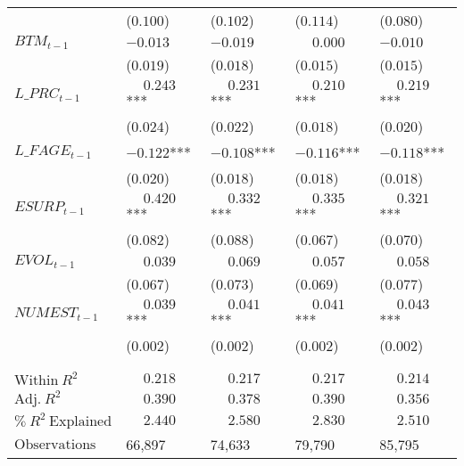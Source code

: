 \begin{table}
\begin{tabular}[t]{>{\raggedright\arraybackslash}p{3.1cm}>{\raggedright\arraybackslash}p{2.6cm}>{\raggedright\arraybackslash}p{2.6cm}>{\raggedright\arraybackslash}p{2.6cm}>{\raggedright\arraybackslash}p{2.6cm}}
 & (\phantom{-}$0.100$) & (\phantom{-}$0.102$) & (\phantom{-}$0.114$) & (\phantom{-}$0.080$)\\
\addlinespace
$BTM_{t-1}$ & $-0.013$ & $-0.019$ & $\phantom{-}0.000$ & $-0.010$\\
 & (\phantom{-}$0.019$) & (\phantom{-}$0.018$) & (\phantom{-}$0.015$) & (\phantom{-}$0.015$)\\
\addlinespace
$L\_PRC_{t-1}$ & $\phantom{-}0.243$*** & $\phantom{-}0.231$*** & $\phantom{-}0.210$*** & $\phantom{-}0.219$***\\
 & (\phantom{-}$0.024$) & (\phantom{-}$0.022$) & (\phantom{-}$0.018$) & (\phantom{-}$0.020$)\\
\addlinespace
$L\_FAGE_{t-1}$ & $-0.122$*** & $-0.108$*** & $-0.116$*** & $-0.118$***\\
 & (\phantom{-}$0.020$) & (\phantom{-}$0.018$) & (\phantom{-}$0.018$) & (\phantom{-}$0.018$)\\
\addlinespace
$ESURP_{t-1}$ & $\phantom{-}0.420$*** & $\phantom{-}0.332$*** & $\phantom{-}0.335$*** & $\phantom{-}0.321$***\\
 & (\phantom{-}$0.082$) & (\phantom{-}$0.088$) & (\phantom{-}$0.067$) & (\phantom{-}$0.070$)\\
\addlinespace
$EVOL_{t-1}$ & $\phantom{-}0.039$ & $\phantom{-}0.069$ & $\phantom{-}0.057$ & $\phantom{-}0.058$\\
 & (\phantom{-}$0.067$) & (\phantom{-}$0.073$) & (\phantom{-}$0.069$) & (\phantom{-}$0.077$)\\
\addlinespace
$NUMEST_{t-1}$ & $\phantom{-}0.039$*** & $\phantom{-}0.041$*** & $\phantom{-}0.041$*** & $\phantom{-}0.043$***\\
 & (\phantom{-}$0.002$) & (\phantom{-}$0.002$) & (\phantom{-}$0.002$) & (\phantom{-}$0.002$)\\
 &  &  &  \vphantom{1} & \\
\midrule
 &  &  &  & \\
$\textrm{Within} \: R^2$ & {$\phantom{-}0.218$} & {$\phantom{-}0.217$} & {$\phantom{-}0.217$} & {$\phantom{-}0.214$}\\
$\textrm{Adj.} \: R^2$ & {$\phantom{-}0.390$} & {$\phantom{-}0.378$} & {$\phantom{-}0.390$} & {$\phantom{-}0.356$}\\
$\% \: R^2 \: \textrm{Explained}$ & {$\phantom{-}2.440$} & {$\phantom{-}2.580$} & {$\phantom{-}2.830$} & {$\phantom{-}2.510$}\\
$\textrm{Observations}$ & {\phantom{-}66,897} & {\phantom{-}74,633} & {\phantom{-}79,790} & {\phantom{-}85,795}\\
\bottomrule
\end{tabular}
\end{table}